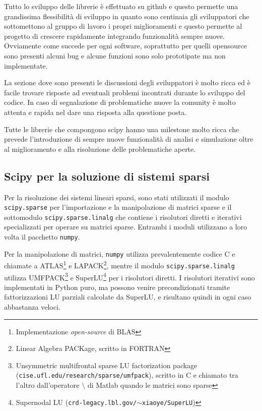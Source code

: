 \documentclass[11pt,a4paper]{scrartcl}
\begin{document}
Tutto lo sviluppo delle librerie è effettuato su github e questo permette una grandissima flessibilità di sviluppo in quanto sono centinaia gli sviluppatori che sottomettono al gruppo di lavoro i propri miglioramenti e questo permette al progetto di crescere rapidamente integrando funzionalità sempre nuove. Ovviamente come succede per ogni software, soprattutto per quelli opensource sono presenti alcuni bug e alcune funzioni sono solo prototipate ma non implementate.

La sezione dove sono presenti le discussioni degli sviluppatori è molto ricca ed è facile trovare risposte ad eventuali problemi incontrati durante lo sviluppo del codice. In caso di segnalazione di problematiche nuove la comunity è molto attenta e rapida nel dare una risposta alla questione posta.

Tutte le librerie che compongono scipy hanno una milestone molto ricca che prevede l'introduzione di sempre nuove funzionalità di analisi e simulazione oltre al miglioramento e alla risoluzione delle problematiche aperte.

\subsection*{Scipy per la soluzione di sistemi sparsi}

Per la risoluzione dei sistemi lineari sparsi, sono stati utilizzati il modulo \texttt{scipy.sparse} per l'importazione e la manipolazione di matrici sparse e il sottomodulo \texttt{scipy.sparse.linalg} che contiene i risolutori diretti e iterativi specializzati per operare su matrici sparse. Entrambi i moduli utilizzano a loro volta il pacchetto \texttt{numpy}.

Per la manipolazione di matrici, \texttt{numpy} utilizza prevalentemente codice C e chiamate a ATLAS\footnote{Implementazione \emph{open-source} di BLAS} e LAPACK\footnote{Linear Algebra PACKage, scritto in FORTRAN}, mentre il modulo \texttt{scipy.sparse.linalg} utilizza UMFPACK\footnote{Unsymmetric multifrontal sparse LU factorization package (\texttt{cise.ufl.edu/research/sparse/umfpack}), scritto in C e chiamato tra l'altro dall'operatore $\setminus$ di Matlab quando le matrici sono sparse} e SuperLU\footnote{Supernodal LU (\texttt{crd-legacy.lbl.gov/$\sim$xiaoye/SuperLU})} per i risolutori diretti. I risolutori iterativi sono implementati in Python puro, ma possono venire precondizionati tramite fattorizzazioni LU parziali calcolate da SuperLU, e risultano quindi in ogni caso abbastanza veloci.
\end{document}
